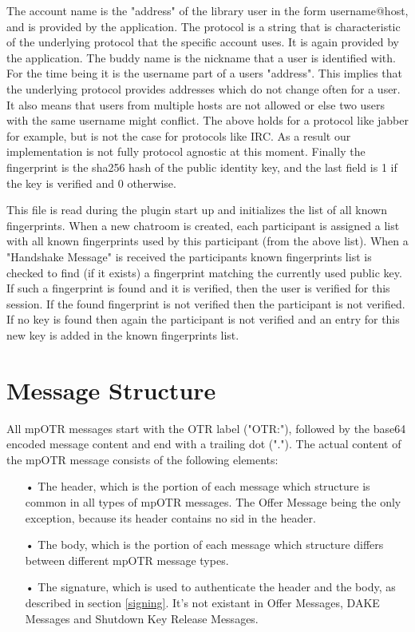\documentclass[12pt,titlepage,a4paper]{article}
\begin{document}
The account name is the "address" of the library user in the form username@host, and is provided by the application.
The protocol is a string that is characteristic of the underlying protocol that the specific account uses.
It is again provided by the application.
The buddy name is the nickname that a user is identified with.
For the time being it is the username part of a users "address".
This implies that the underlying protocol provides addresses which do not change often for a user.
It also means that users from multiple hosts are not allowed or else two users with the same username might conflict.
The above holds for a protocol like jabber for example, but is not the case for protocols like IRC.
As a result our implementation is not fully protocol agnostic at this moment.
Finally the fingerprint is the sha256 hash of the public identity key, and the last field is 1 if the key is verified and 0 otherwise.

This file is read during the plugin start up and initializes the list of all known fingerprints.
When a new chatroom is created, each participant is assigned a list with all known fingerprints used by this participant (from the above list).
When a "Handshake Message" is received the participants known fingerprints list is checked to find (if it exists) a fingerprint matching the currently used public key.
If such a fingerprint is found and it is verified, then the user is verified for this session.
If the found fingerprint is not verified then the participant is not verified.
If no key is found then again the participant is not verified and an entry for this new key is added in the known fingerprints list.

\section{Message Structure}

All mpOTR messages start with the OTR label ("OTR:"), followed by the base64 encoded message content and end with a trailing dot ("."). The actual content of the mpOTR message consists of the following elements: \\

\begin{itemize}
	\item[•]The header, which is the portion of each message which structure is common in all types of mpOTR messages. The Offer Message being the only exception, because its header contains no sid in the header.

	\item[•]The body, which is the portion of each message which structure differs between different mpOTR message types.

	\item[•]The signature, which is used to authenticate the header and the body, as described in section \ref{signing}. It's not existant in Offer Messages, DAKE Messages and Shutdown Key Release Messages.
\end{itemize}
\end{document}
